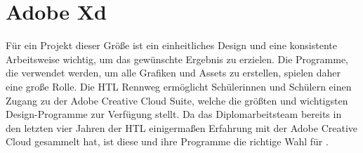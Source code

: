 
\section{Adobe Xd}\label{sec:adobexd}

\renewcommand{\kapitelautor}{Autor: Irgendwer} %

%
Für ein Projekt dieser Größe ist ein einheitliches Design und eine konsistente Arbeitsweise wichtig, um das gewünschte Ergebnis zu erzielen. Die Programme, die verwendet werden, um alle Grafiken und Assets zu erstellen,
spielen daher eine große Rolle. Die HTL Rennweg ermöglicht Schülerinnen und Schülern einen Zugang zu der Adobe Creative Cloud Suite, welche die größten und wichtigsten Design-Programme zur Verfügung stellt.
Da das Diplomarbeitsteam bereits in den letzten vier Jahren der HTL einigermaßen Erfahrung mit der Adobe Creative Cloud gesammelt hat, ist diese und ihre Programme die richtige Wahl für \FF.


\renewcommand{\kapitelautor}{}

